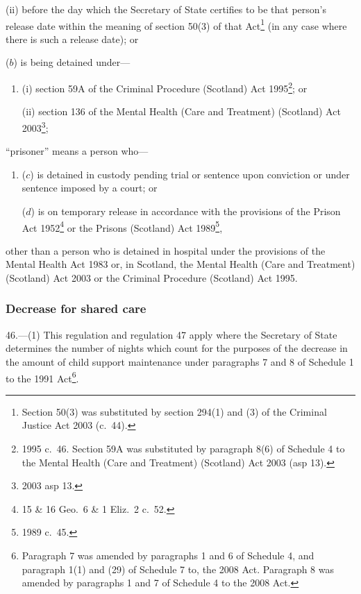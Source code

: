 \documentclass[12pt,a4paper]{article}
\begin{document}
\begin{enumerate}
\begin{enumerate}
\begin{enumerate}
(ii) 
before the day which the Secretary of State certifies to be that person’s release date within the meaning of section 50(3) of that Act\footnote{Section 50(3) was substituted by section 294(1) and (3) of the Criminal Justice Act 2003 (c.~44).} (in any case where there is such a release date); or
\end{enumerate}

($b$) 
is being detained under—
\begin{enumerate}\item[]
(i) 
section 59A of the Criminal Procedure (Scotland) Act 1995\footnote{1995 c.~46. Section 59A was substituted by paragraph 8(6) of Schedule 4 to the Mental Health (Care and Treatment) (Scotland) Act 2003 (asp 13).}; or

(ii) 
section 136 of the Mental Health (Care and Treatment) (Scotland) Act 2003\footnote{2003 asp 13.};
\end{enumerate}
\end{enumerate}

“prisoner” means a person who—
\begin{enumerate}\item[]
($c$) 
is detained in custody pending trial or sentence upon conviction or under sentence imposed by a court; or

($d$) 
is on temporary release in accordance with the provisions of the Prison Act 1952\footnote{15 \& 16 Geo.~6 \& 1 Eliz.~2 c.~52.} or the Prisons (Scotland) Act 1989\footnote{1989 c.~45.},
\end{enumerate}
other than a person who is detained in hospital under the provisions of the Mental Health Act 1983 or, in Scotland, the Mental Health (Care and Treatment) (Scotland) Act 2003 or the Criminal Procedure (Scotland) Act 1995.
\end{enumerate}

\subsubsection[46. Decrease for shared care]{Decrease for shared care}

46.---(1)  This regulation and regulation 47 apply where the Secretary of State determines the number of nights which count for the purposes of the decrease in the amount of child support maintenance under paragraphs 7 and 8 of Schedule 1 to the 1991 Act\footnote{Paragraph 7 was amended by paragraphs 1 and 6 of Schedule 4, and paragraph 1(1) and (29) of Schedule 7 to, the 2008 Act. Paragraph 8 was amended by paragraphs 1 and 7 of Schedule 4 to the 2008 Act.}.
\end{document}
